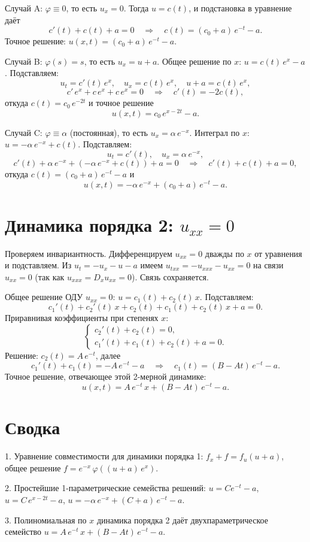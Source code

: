 \documentclass[12pt]{article}
\begin{document}
Случай A: $\varphi \equiv 0$, то есть $u_x = 0$. Тогда $u = c(t)$, и подстановка в уравнение даёт
\[
c'(t) + c(t) + a = 0 \quad\Longrightarrow\quad c(t) = (c_0 + a)\, e^{-t} - a.
\]
Точное решение: $u(x, t) = (c_0 + a)\, e^{-t} - a$.

Случай B: $\varphi(s) = s$, то есть $u_x = u + a$. Общее решение по $x$: $u = c(t)\, e^{x} - a$. Подставляем:
\[
u_t = c'(t)\, e^{x}, \quad u_x = c(t)\, e^{x}, \quad u + a = c(t)\, e^{x},
\]
\[
c'\, e^{x} + c\, e^{x} + c\, e^{x} = 0 \quad\Longrightarrow\quad c'(t) = -2 c(t),
\]
откуда $c(t) = c_0\, e^{-2 t}$ и точное решение
\[
u(x,t) = c_0\, e^{x - 2 t} - a.
\]

Случай C: $\varphi \equiv \alpha$ (постоянная), то есть $u_x = \alpha\, e^{-x}$. Интеграл по $x$: $u = -\alpha\, e^{-x} + c(t)$. Подставляем:
\[
u_t = c'(t), \quad u_x = \alpha\, e^{-x},
\]
\[
c'(t) + \alpha\, e^{-x} + (-\alpha\, e^{-x} + c(t)) + a = 0
\quad\Longrightarrow\quad c'(t) + c(t) + a = 0,
\]
откуда $c(t) = (c_0 + a)\, e^{-t} - a$ и
\[
u(x,t) = -\alpha\, e^{-x} + (c_0 + a)\, e^{-t} - a.
\]

\section*{Динамика порядка 2: $u_{xx} = 0$}

Проверяем инвариантность. Дифференцируем $u_{xx} = 0$ дважды по $x$ от уравнения и подставляем. Из $u_t = -u_x - u - a$ имеем $u_{txx} = -u_{xxx} - u_{xx} = 0$ на связи $u_{xx} = 0$ (так как $u_{xxx} = D_x u_{xx} = 0$). Связь сохраняется.

Общее решение ОДУ $u_{xx} = 0$: $u = c_1(t) + c_2(t)\, x$. Подставляем:
\[
c_1'(t) + c_2'(t)\, x + c_2(t) + c_1(t) + c_2(t)\, x + a = 0.
\]
Приравнивая коэффициенты при степенях $x$:
\[
\begin{cases}
c_2'(t) + c_2(t) = 0,\\
c_1'(t) + c_1(t) + c_2(t) + a = 0.
\end{cases}
\]
Решение: $c_2(t) = A\, e^{-t}$, далее
\[
c_1'(t) + c_1(t) = -A\, e^{-t} - a \quad\Longrightarrow\quad c_1(t) = (B - A t)\, e^{-t} - a.
\]
Точное решение, отвечающее этой 2-мерной динамике:
\[
u(x, t) = A\, e^{-t}\, x + (B - A t)\, e^{-t} - a.
\]

\section*{Сводка}

1. Уравнение совместимости для динамики порядка 1: $f_x + f = f_u(u + a)$, общее решение $f = e^{-x}\, \varphi((u+a)\, e^{x})$.

2. Простейшие 1-параметрические семейства решений: $u = C e^{-t} - a$, $u = C\, e^{x - 2 t} - a$, $u = -\alpha\, e^{-x} + (C + a)\, e^{-t} - a$.

3. Полиномиальная по $x$ динамика порядка 2 даёт двухпараметрическое семейство $u = A\, e^{-t}\, x + (B - A t)\, e^{-t} - a$.
\end{document}
